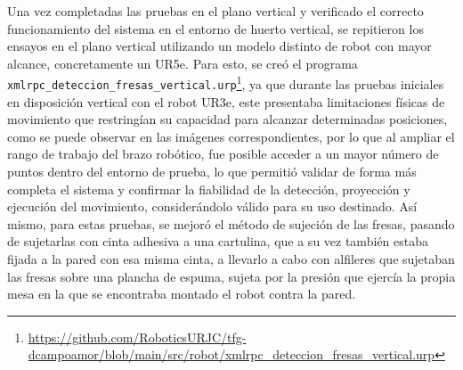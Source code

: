 Una vez completadas las pruebas en el plano vertical y verificado el correcto funcionamiento del sistema en el entorno de huerto vertical, se repitieron los ensayos en el plano vertical utilizando un modelo distinto de robot con mayor alcance, concretamente un UR5e. Para esto, se creó el programa \verb|xmlrpc_deteccion_fresas_vertical.urp|\footnote{\url{https://github.com/RoboticsURJC/tfg-dcampoamor/blob/main/src/robot/xmlrpc\_deteccion\_fresas\_vertical.urp}}, ya que durante las pruebas iniciales en disposición vertical con el robot UR3e, este presentaba limitaciones físicas de movimiento que restringían su capacidad para alcanzar determinadas posiciones, como se puede observar en las imágenes correspondientes, por lo que al ampliar el rango de trabajo del brazo robótico, fue posible acceder a un mayor número de puntos dentro del entorno de prueba, lo que permitió validar de forma más completa el sistema y confirmar la fiabilidad de la detección, proyección y ejecución del movimiento, considerándolo válido para su uso destinado. Así mismo, para estas pruebas, se mejoró el método de sujeción de las fresas, pasando de sujetarlas con cinta adhesiva a una cartulina, que a su vez también estaba fijada a la pared con esa misma cinta, a llevarlo a cabo con alfileres que sujetaban las fresas sobre una plancha de espuma, sujeta por la presión que ejercía la propia mesa en la que se encontraba montado el robot contra la pared.



